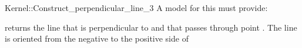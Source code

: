 \begin{ccRefFunctionObjectConcept}{Kernel::Construct_perpendicular_line_3}
A model for this must provide:


       {returns the line that is perpendicular to  and that
        passes through point . The line is oriented from
        the negative to the positive side of }

\ccIsModel{}

\end{ccRefFunctionObjectConcept}
